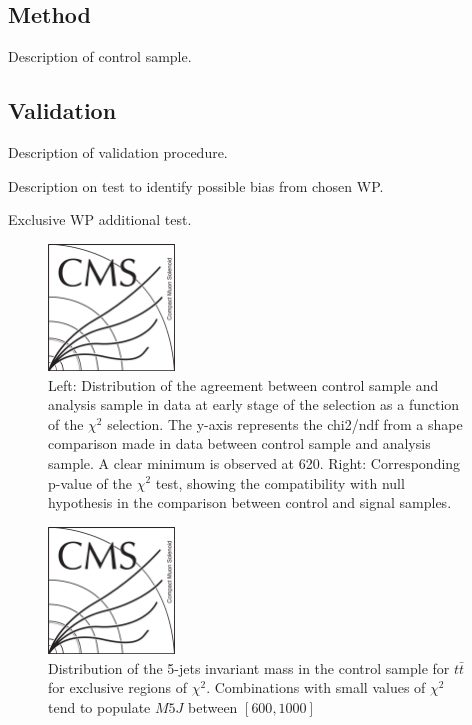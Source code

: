 
\subsection{Method}
\label{sec:bkgmet}

Description of control sample.

\subsection{Validation}
\label{sec:validation}

Description of validation procedure.

Description on test to identify possible bias from chosen WP.

Exclusive WP additional test.

\begin{figure}[!Hhtbp]
  \begin{center}
    \includegraphics[width=0.3\textwidth]{figs/CMSlogo.png}
    \caption{Left: Distribution of the agreement between control sample and analysis sample in data at early stage of the selection as a function of the $\chi^2$ selection. The y-axis represents the chi2/ndf from a shape comparison made in data between control sample and analysis sample. A clear minimum is observed at 620. Right: Corresponding p-value of the $\chi^{2}$ test, showing the compatibility with null hypothesis in the comparison between control and signal samples.}
    \label{fig:optchi2}
  \end{center}
\end{figure}\clearpage

\begin{figure}[!Hhtbp]
  \begin{center}
    \includegraphics[width=0.3\textwidth]{figs/CMSlogo.png}
    \caption{Distribution of the 5-jets invariant mass in the control sample for $t\bar{t}$ for exclusive regions of $\chi^{2}$. Combinations with small values of $\chi^{2}$ tend to populate $M5J$ between $[600,1000]$}
    \label{fig:Chi2Regions}
  \end{center}
\end{figure}\clearpage

